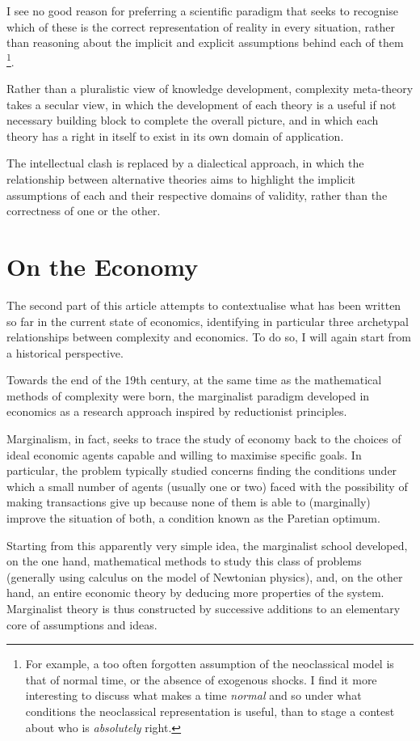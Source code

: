 \documentclass[a4paper, headings=standardclasses]{scrartcl}
\begin{document}
I see no good reason for preferring a scientific paradigm that seeks to recognise which of these is the correct representation of reality in every situation, rather than reasoning about the implicit and explicit assumptions behind each of them \footnote{For example, a too often forgotten assumption of the neoclassical model is that of normal time, or the absence of exogenous shocks. I find it more interesting to discuss what makes a time \textit{normal} and so under what conditions the neoclassical representation is useful, than to stage a contest about who is \textit{absolutely} right.}.

Rather than a pluralistic view of knowledge development, complexity meta-theory takes a secular view, in which the development of each theory is a useful if not necessary building block to complete the overall picture, and in which each theory has a right in itself to exist in its own domain of application.

The intellectual clash is replaced by a dialectical approach, in which the relationship between alternative theories aims to highlight the implicit assumptions of each and their respective domains of validity, rather than the correctness of one or the other.

\section{On the Economy}
The second part of this article attempts to contextualise what has been written so far in the current state of economics, identifying in particular three archetypal relationships
between complexity and economics.
To do so, I will again start from a historical perspective.

Towards the end of the 19th century, at the same time as the mathematical methods of complexity were born, the marginalist paradigm developed in economics as a research approach inspired by reductionist principles. 

Marginalism, in fact, seeks to trace the study of economy back to the choices of ideal economic agents capable and willing to maximise specific goals. 
In particular, the problem typically studied concerns finding the conditions under which a small number of agents (usually one or two) faced with the possibility of making transactions give up because none of them is able to (marginally) improve the situation of both, a condition known as the Paretian optimum.

Starting from this apparently very simple idea, the marginalist school developed, on the one hand, mathematical methods to study this class of problems (generally using calculus on the model of Newtonian physics), and, on the other hand, an entire economic theory by deducing more properties of the system.
Marginalist theory is thus constructed by successive additions to an elementary core of assumptions and ideas.
\end{document}
